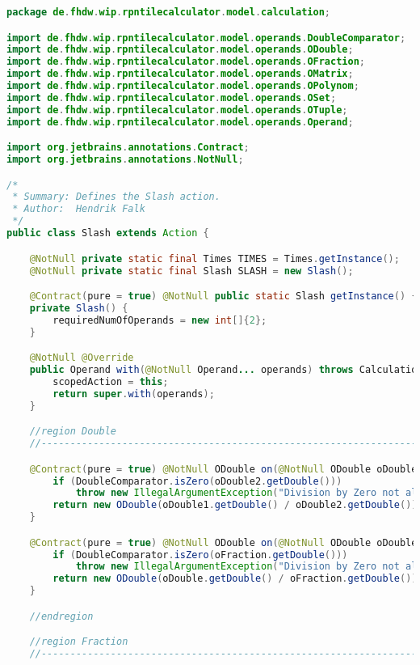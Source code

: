 \begin{lstlisting}[caption=Slash (Falk),label=list:Slash,language=Java]
package de.fhdw.wip.rpntilecalculator.model.calculation;

import de.fhdw.wip.rpntilecalculator.model.operands.DoubleComparator;
import de.fhdw.wip.rpntilecalculator.model.operands.ODouble;
import de.fhdw.wip.rpntilecalculator.model.operands.OFraction;
import de.fhdw.wip.rpntilecalculator.model.operands.OMatrix;
import de.fhdw.wip.rpntilecalculator.model.operands.OPolynom;
import de.fhdw.wip.rpntilecalculator.model.operands.OSet;
import de.fhdw.wip.rpntilecalculator.model.operands.OTuple;
import de.fhdw.wip.rpntilecalculator.model.operands.Operand;

import org.jetbrains.annotations.Contract;
import org.jetbrains.annotations.NotNull;

/*
 * Summary: Defines the Slash action.
 * Author:  Hendrik Falk
 */
public class Slash extends Action {

    @NotNull private static final Times TIMES = Times.getInstance();
    @NotNull private static final Slash SLASH = new Slash();

    @Contract(pure = true) @NotNull public static Slash getInstance() { return SLASH; }
    private Slash() {
        requiredNumOfOperands = new int[]{2};
    }

    @NotNull @Override
    public Operand with(@NotNull Operand... operands) throws CalculationException {
        scopedAction = this;
        return super.with(operands);
    }

    //region Double
    //------------------------------------------------------------------------------------

    @Contract(pure = true) @NotNull ODouble on(@NotNull ODouble oDouble1, @NotNull ODouble oDouble2) {
        if (DoubleComparator.isZero(oDouble2.getDouble()))
            throw new IllegalArgumentException("Division by Zero not allowed");
        return new ODouble(oDouble1.getDouble() / oDouble2.getDouble());
    }

    @Contract(pure = true) @NotNull ODouble on(@NotNull ODouble oDouble, @NotNull OFraction oFraction) {
        if (DoubleComparator.isZero(oFraction.getDouble()))
            throw new IllegalArgumentException("Division by Zero not allowed");
        return new ODouble(oDouble.getDouble() / oFraction.getDouble());
    }

    //endregion

    //region Fraction
    //------------------------------------------------------------------------------------


\end{lstlisting}
